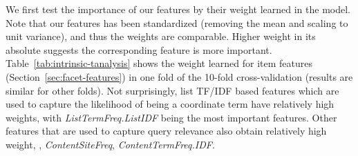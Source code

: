 We first test the importance of our features by their weight learned in the model. Note that our features has been standardized (removing the mean and scaling to unit variance), and thus the weights are comparable. Higher weight in its absolute suggests the corresponding feature is more important. Table~\ref{tab:intrinsic-tanalysis} shows the weight learned for item features (Section~\ref{sec:facet-features}) in one fold of the 10-fold cross-validation (results are similar for other folds). Not surprisingly, list TF/IDF based features which are used to capture the likelihood of being a coordinate term have relatively high weights, with \textit{ListTermFreq.ListIDF} being the most important features. Other features that are used to capture query relevance also obtain relatively high weight, \eg, \textit{ContentSiteFreq}, \textit{ContentTermFreq.IDF}. 

